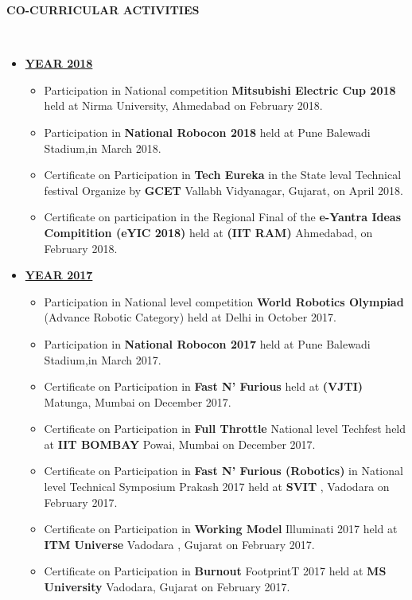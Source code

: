 \documentclass[a4paper,10pt]{article}
\newcommand{\isep}{-2 pt}
\newcommand{\resheading}[1]{{\small \colorbox{mygrey}{\begin{minipage}{0.975\textwidth}{\textbf{#1 \vphantom{p\^{E}}}}\end{minipage}}}}
\begin{document}
\resheading{\textbf{CO-CURRICULAR ACTIVITIES}  }\\ [\isep]
\begin{itemize}
    \item \underline{\textbf{YEAR 2018}}
    \begin{itemize}
    
    \item  Participation in National competition \textbf{ Mitsubishi Electric Cup 2018 } held at Nirma University, Ahmedabad on February 2018.
    \item \noindent Participation in \textbf{National Robocon 2018} held at Pune Balewadi Stadium,in March 2018.
    \item \noindent Certificate on Participation in \textbf{ Tech Eureka} in the State leval Technical festival Organize by \textbf{ GCET } Vallabh Vidyanagar, Gujarat, on April 2018.
    \item \noindent  Certificate on participation in the Regional Final of the \textbf{ e-Yantra Ideas Compitition (eYIC 2018) } held at \textbf{  (IIT RAM) } Ahmedabad, on February 2018.
    \end{itemize}
    
    \item \underline {\textbf{YEAR 2017}}
    \begin{itemize}
    
    \item \noindent Participation in National level competition \textbf{ World Robotics Olympiad }(Advance Robotic Category) held at Delhi in October 2017. 
    \item \noindent Participation in \textbf{National Robocon 2017} held at Pune Balewadi Stadium,in March 2017.
    \item \noindent Certificate on Participation in \textbf{ Fast N' Furious } held at \textbf{ (VJTI) } Matunga, Mumbai  on December 2017. 
    \item \noindent Certificate on Participation in \textbf{ Full Throttle } National level Techfest held at \textbf{IIT BOMBAY } Powai, Mumbai on December 2017.
    \item \noindent Certificate on Participation in \textbf{ Fast N' Furious (Robotics) }  in National level Technical Symposium Prakash 2017 held at \textbf{ SVIT }, Vadodara  on February 2017.
    \item \noindent Certificate on Participation in \textbf{ Working Model } Illuminati 2017  held at \textbf{ITM Universe } Vadodara  , Gujarat on February 2017.
    \item \noindent Certificate on Participation in \textbf{ Burnout } FootprintT 2017  held at \textbf{MS University } Vadodara, Gujarat on February 2017.
    \end{itemize}
    

\end{itemize}
\end{document}
